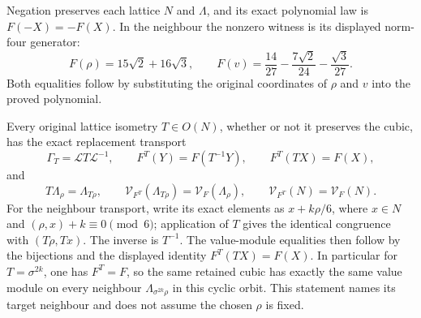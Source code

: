 Negation preserves each lattice \(N\) and \(\Lambda\), and its
exact polynomial law is \(F(-X)=-F(X)\). In the neighbour the
nonzero witness is its displayed norm-four generator:
\begin{equation}
 F(\rho)=15\sqrt2+16\sqrt3,\qquad
 F(v)=\frac{14}{27}-\frac{7\sqrt2}{24}-\frac{\sqrt3}{27}.
 \label{nca:eq:special-values}
\end{equation}
Both equalities follow by substituting the original coordinates
of \(\rho\) and \(v\) into the proved polynomial.

Every original lattice isometry \(T\in O(N)\), whether or not
it preserves the cubic, has the exact replacement transport
\begin{equation}
 \Gamma_T=\mathcal LT\mathcal L^{-1},\qquad
 F^T(Y)=F(T^{-1}Y),\qquad F^T(TX)=F(X),
 \label{nca:eq:all-transport}
\end{equation}
and
\[
 T\Lambda_\rho=\Lambda_{T\rho},\qquad
 \mathcal V_{F^T}(\Lambda_{T\rho})=\mathcal V_F(\Lambda_\rho),
 \qquad \mathcal V_{F^T}(N)=\mathcal V_F(N).
\]
For the neighbour transport, write its exact elements as
\(x+k\rho/6\), where \(x\in N\) and
\((\rho,x)+k\equiv0\pmod6\); application of \(T\) gives
the identical congruence with \((T\rho,Tx)\). The inverse is
\(T^{-1}\). The value-module equalities then follow by the
bijections and the displayed identity \(F^T(TX)=F(X)\).
In particular for \(T=\sigma^{2k}\), one has \(F^T=F\), so
the same retained cubic has exactly the same value module on
every neighbour \(\Lambda_{\sigma^{2k}\rho}\) in this cyclic
orbit. This statement names its target neighbour and does not
assume the chosen \(\rho\) is fixed.
